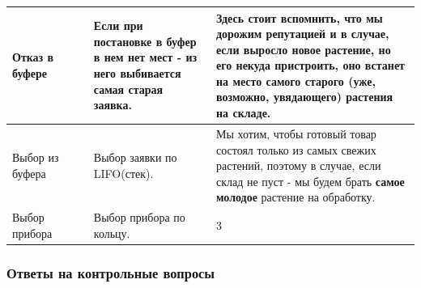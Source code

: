 \documentclass[a4paper, 14pt]{article}
\begin{document}
\begin{center}
\begin{tabular}{|p{0.2\linewidth} | p{0.3\linewidth}| p{0.5\linewidth}|}
		\hline
		Отказ в буфере     & Если при постановке в буфер в нем нет мест - из него выбивается самая старая заявка. & Здесь стоит вспомнить, что мы дорожим репутацией и в случае, если выросло новое растение, но его некуда пристроить, оно встанет на место \textbf{самого старого} (уже, возможно, увядающего) растения на складе.                                                                                                                                                                \\
		\hline
		Выбор из буфера    & Выбор заявки по LIFO(стек).                                                          & Мы хотим, чтобы готовый товар состоял только из самых свежих растений, поэтому в случае, если склад не пуст - мы будем брать \textbf{самое молодое} растение на обработку.                                                                                                                                                                                                      \\
		\hline
		Выбор прибора      & Выбор прибора по кольцу.                                                             & 3                                                                                                                                                                                                                                                                                                                                                                               \\
		\hline
	\end{tabular}
\end{center}

\subsubsection{Ответы на контрольные вопросы}
\end{document}
